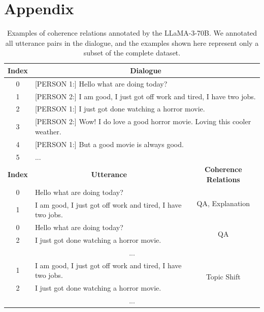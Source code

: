 \documentclass[letterpaper]{article} %
\begin{document}
\newpage

\appendix
\section{Appendix}

\begin{table}[h]
\centering
\def\arraystretch{1.5}%
\begin{tabular}{|c|l|c|}
\hline

\rowcolor[RGB]{204,217,245}
\textbf{Index} & \multicolumn{2}{|c|}{\textbf{Dialogue}} \\
\hline

0 & \multicolumn{2}{|p{14cm}|}{[PERSON 1:] Hello what are doing today?} \\
\cline{1-1}
1 & \multicolumn{2}{|p{14cm}|}{[PERSON 2:] I am good, I just got off work and tired, I have two jobs.} \\
\cline{1-1}
2 & \multicolumn{2}{|p{14cm}|}{[PERSON 1:] I just got done watching a horror movie.} \\
\cline{1-1}
3 & \multicolumn{2}{|p{14cm}|}{[PERSON 2:] Wow! I do love a good horror movie. Loving this cooler weather.} \\
\cline{1-1}
4 & \multicolumn{2}{|p{14cm}|}{[PERSON 1:] But a good movie is always good.} \\
\cline{1-1}
5 & \multicolumn{2}{|p{14cm}|}{...} \\
\hline

\rowcolor[RGB]{204,217,245}
\textbf{Index} & \multicolumn{1}{|c|}{\textbf{Utterance}} & \textbf{Coherence Relations} \\
\hline

0 & Hello what are doing today? & \multirow{2}{*}{QA, Explanation} \\
\cline{1-2}
1 & I am good, I just got off work and tired, I have two jobs. & \\
\hline

0 & Hello what are doing today? & \multirow{2}{*}{QA} \\
\cline{1-2}
2 & I just got done watching a horror movie. & \\

\hline
\multicolumn{3}{|c|}{...} \\
\hline

1 & I am good, I just got off work and tired, I have two jobs. & \multirow{2}{*}{Topic Shift} \\
\cline{1-2}
2 & I just got done watching a horror movie. & \\
\hline

\multicolumn{3}{|c|}{...} \\
\hline

\end{tabular}
\caption{Examples of coherence relations annotated by the LLaMA-3-70B\protect\footnotemark\cite{llama3modelcard}. We annotated all utterance pairs in the dialogue, and the examples shown here represent only a subset of the complete dataset.}
\label{table:coherence-relations-annotated-example}
\end{table}
\end{document}
